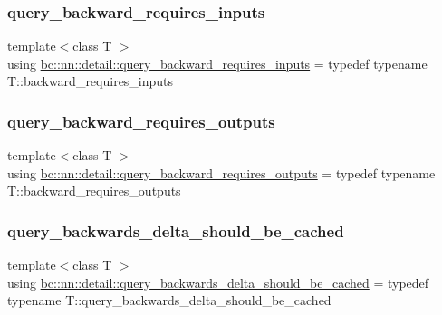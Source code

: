 \subsubsection{\texorpdfstring{query\+\_\+backward\+\_\+requires\+\_\+inputs}{query\_backward\_requires\_inputs}}
{\footnotesize\ttfamily template$<$class T $>$ \\
using \hyperlink{namespacebc_1_1nn_1_1detail_acb9ab0f627cee62dd68d673afc443608}{bc\+::nn\+::detail\+::query\+\_\+backward\+\_\+requires\+\_\+inputs} = typedef typename T\+::backward\+\_\+requires\+\_\+inputs}

\mbox{\label{namespacebc_1_1nn_1_1detail_ad187de638865a7fbfe0e3c1db1511e4a}} 
\subsubsection{\texorpdfstring{query\+\_\+backward\+\_\+requires\+\_\+outputs}{query\_backward\_requires\_outputs}}
{\footnotesize\ttfamily template$<$class T $>$ \\
using \hyperlink{namespacebc_1_1nn_1_1detail_ad187de638865a7fbfe0e3c1db1511e4a}{bc\+::nn\+::detail\+::query\+\_\+backward\+\_\+requires\+\_\+outputs} = typedef typename T\+::backward\+\_\+requires\+\_\+outputs}

\mbox{\label{namespacebc_1_1nn_1_1detail_a9348aef49158fa3a605fcc4eb9387c87}} 
\subsubsection{\texorpdfstring{query\+\_\+backwards\+\_\+delta\+\_\+should\+\_\+be\+\_\+cached}{query\_backwards\_delta\_should\_be\_cached}}
{\footnotesize\ttfamily template$<$class T $>$ \\
using \hyperlink{namespacebc_1_1nn_1_1detail_a9348aef49158fa3a605fcc4eb9387c87}{bc\+::nn\+::detail\+::query\+\_\+backwards\+\_\+delta\+\_\+should\+\_\+be\+\_\+cached} = typedef typename T\+::query\+\_\+backwards\+\_\+delta\+\_\+should\+\_\+be\+\_\+cached}

